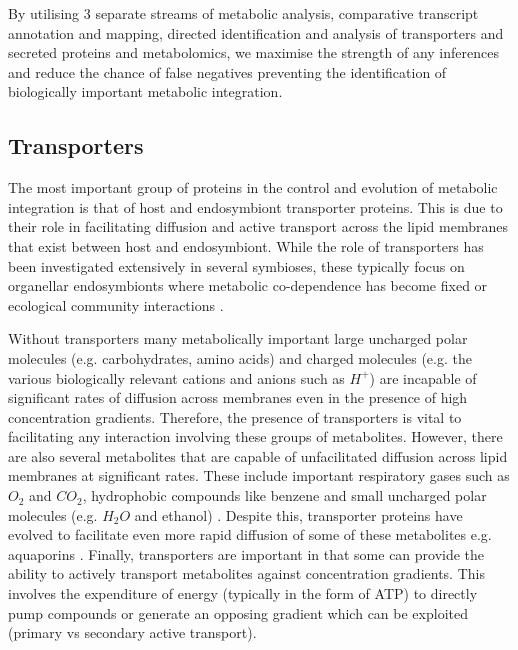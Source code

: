 By utilising 3 separate streams of metabolic analysis, comparative transcript annotation
and mapping, directed identification and analysis of transporters and secreted
proteins and metabolomics, we maximise the strength of any inferences and 
reduce the chance of false negatives preventing the identification of biologically
important metabolic integration.

\subsection{Transporters}

The most important group of proteins in the control and evolution
of metabolic integration is that of host and endosymbiont transporter proteins.
This is due to their role in facilitating diffusion and active transport
across the lipid membranes that exist between host and endosymbiont.
While the role of transporters has been investigated extensively in 
several symbioses, these typically focus on organellar endosymbionts where
metabolic co-dependence has become fixed \citep{Yuan1994,Tyra2007,Huang2007,Li2010a} 
or ecological community interactions 
\citep{Richards2013,Hirner2006,Bachmann2013,Oldroyd2009}.


Without transporters many metabolically important 
large uncharged polar molecules (e.g. carbohydrates, amino acids)
and charged molecules (e.g. the various biologically relevant cations and anions such
as \(H^{+}\)) are incapable of significant rates of diffusion 
across membranes even in the presence of high concentration gradients. 
Therefore, the presence of transporters is vital to facilitating
any interaction involving these groups of metabolites. 
However, there are also several metabolites that are capable 
of unfacilitated diffusion across lipid membranes at significant rates.
These include important respiratory gases such as \(O_{2}\) and \(CO_2\),
hydrophobic compounds like benzene and small uncharged polar molecules
(e.g. \(H_2O\) and ethanol) \citep{cooper2013the,alberts2015molecular}.  
Despite this, transporter proteins have evolved to facilitate
even more rapid diffusion of some of these metabolites e.g. aquaporins
\citep{Agre1993}.  
Finally, transporters are important in that some can provide the ability
to actively transport metabolites against concentration gradients. 
This involves the expenditure of energy (typically in the form of ATP)
to directly pump compounds or generate an opposing gradient which can be
exploited (primary vs secondary active transport). 


